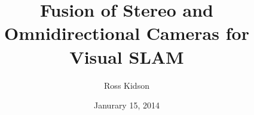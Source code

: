 \newcommand{\thedoctype}{Master's Thesis in Robotics, Cognition and Intelligence\xspace}
\newcommand{\thetitle}{Fusion of Stereo and Omnidirectional Cameras for Visual SLAM\xspace}
\newcommand{\thetitleGer}{Visueller SLAM mittels Datenfusion aus Stereo- und omnidirektionalen Kameras\xspace}
\newcommand{\theauthor}{Ross Kidson\xspace}
\newcommand{\theplace}{Munich\xspace}
\newcommand{\thedate}{Janurary 15, 2014\xspace}
\newcommand{\thesupervisor}{Prof. Dr. Daniel Cremers}
\newcommand{\tumadvisor}{Dr. Juergen Sturm}
\newcommand{\boschadvisor}{Matthias Roland}

\date{\thedate}
\title{\thetitle}
\author{\theauthor}

\newcommand{\footertext}{}
